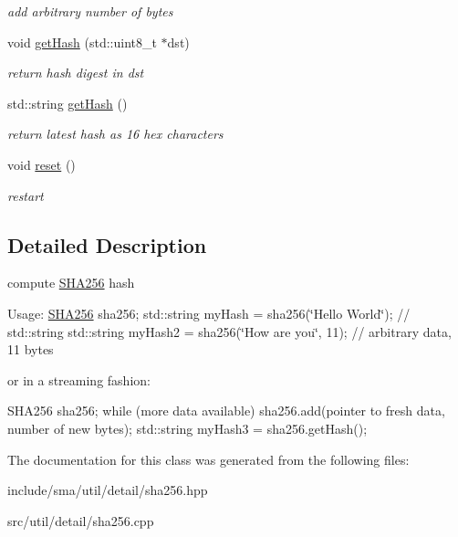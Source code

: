 \begin{DoxyCompactItemize}
\begin{DoxyCompactList}\small\item\em add arbitrary number of bytes \end{DoxyCompactList}\item 
\hypertarget{classSHA256_a45b8ddcd471a717156fa5013c321975f}{void \hyperlink{classSHA256_a45b8ddcd471a717156fa5013c321975f}{get\-Hash} (std\-::uint8\-\_\-t $\ast$dst)}\label{classSHA256_a45b8ddcd471a717156fa5013c321975f}

\begin{DoxyCompactList}\small\item\em return hash digest in dst \end{DoxyCompactList}\item 
\hypertarget{classSHA256_ae7aa752e5d89cc53dcce13818e365f70}{std\-::string \hyperlink{classSHA256_ae7aa752e5d89cc53dcce13818e365f70}{get\-Hash} ()}\label{classSHA256_ae7aa752e5d89cc53dcce13818e365f70}

\begin{DoxyCompactList}\small\item\em return latest hash as 16 hex characters \end{DoxyCompactList}\item 
\hypertarget{classSHA256_ad9d80d8fdccffb15497bd36285afce65}{void \hyperlink{classSHA256_ad9d80d8fdccffb15497bd36285afce65}{reset} ()}\label{classSHA256_ad9d80d8fdccffb15497bd36285afce65}

\begin{DoxyCompactList}\small\item\em restart \end{DoxyCompactList}\end{DoxyCompactItemize}


\subsection{Detailed Description}
compute \hyperlink{classSHA256}{S\-H\-A256} hash 

Usage\-: \hyperlink{classSHA256}{S\-H\-A256} sha256; std\-::string my\-Hash = sha256(\char`\"{}\-Hello World\char`\"{}); // std\-::string std\-::string my\-Hash2 = sha256(\char`\"{}\-How are you\char`\"{}, 11); // arbitrary data, 11 bytes

or in a streaming fashion\-: \begin{DoxyVerb}SHA256 sha256;
while (more data available)
  sha256.add(pointer to fresh data, number of new bytes);
std::string myHash3 = sha256.getHash();\end{DoxyVerb}
 

The documentation for this class was generated from the following files\-:\begin{DoxyCompactItemize}
\item 
include/sma/util/detail/sha256.\-hpp\item 
src/util/detail/sha256.\-cpp\end{DoxyCompactItemize}
